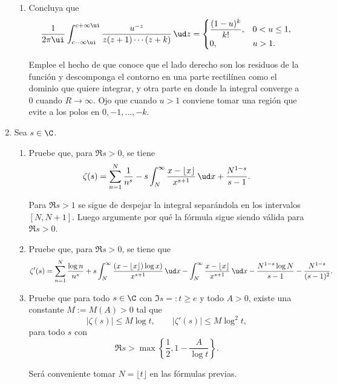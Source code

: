 \documentclass[11pt, reqno]{amsart}
\begin{document}
\begin{enumerate}
\begin{enumerate}
			\item Concluya que
				\[
					\frac{1}{2\pi\ui} \int_{c - \infty\ui}^{c + \infty\ui} \frac{u^{-z}}{z(z+1)\cdots(z+k)} \, \ud z =
					\begin{cases}
						\dfrac{(1 - u)^k}{k!}, & 0 < u \le 1, \\
						0, & u > 1.
					\end{cases}
				\]
				\begin{hint}
					Emplee el hecho de que conoce que el lado derecho son los residuos de la función y descomponga el
					contorno en una parte rectilínea como el dominio que quiere integrar, y otra parte en donde la
					integral converge a 0 cuando $R \to \infty$.
					Ojo que cuando $u > 1$ conviene tomar una región que evite a los polos en $0, -1, \dots, -k$.
				\end{hint}
		\end{enumerate}

	\item Sea $s \in \C$.
		\begin{enumerate}
			\item Pruebe que, para $\Re s > 0$, se tiene
				\[
					\zeta(s) = \sum_{n=1}^{N} \frac{1}{n^s} - s \int_{N}^{\infty} \frac{x - \lfloor x \rfloor}{x^{s+1}} \, \ud
					x + \frac{N^{1-s}}{s - 1}.
				\]
				\begin{hint}
					Para $\Re s > 1$ se sigue de despejar la integral separándola en los intervalos $[N, N + 1]$.
					Luego argumente por qué la fórmula sigue siendo válida para $\Re s > 0$.
				\end{hint}

			\item Pruebe que, para $\Re s > 0$, se tiene que
				\[
					\zeta'(s) = \sum_{n=1}^{N} \frac{\log n}{n^s} + s \int_{N}^{\infty} \frac{(x - \lfloor x \rfloor)\log
					x)}{x^{s+1}} \, \ud x - \int_{N}^{\infty} \frac{x - \lfloor x \rfloor}{x^{s+1}} \, \ud x
					- \frac{N^{1-s}\log N}{s - 1} - \frac{N^{1-s}}{(s-1)^2}.
				\]

			\item Pruebe que para todo $s \in \C$ con $\Im s =: t \ge e$ y todo $A > 0$, existe una constante $M := M(A) > 0$ tal que
				\[
					|\zeta(s)| \le M\log t, \qquad |\zeta'(s)| \le M\log^2 t,
				\]
				para todo $s$ con
				\[
					\Re s > \max\mathopen{}\left\{ \frac{1}{2}, 1 - \frac{A}{\log t} \right\}\mathclose{}.
				\]
				\begin{hint}
					Será conveniente tomar $N = \lfloor t \rfloor$ en las fórmulas previas.
				\end{hint}
		\end{enumerate}
		\nocite{apostol:analytic}


\end{enumerate}
\end{document}
